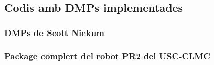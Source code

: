 \documentclass[12pt,a4paper,final,twoside]{article}
\begin{document}
\subsection{Codis amb DMPs implementades}
\subsubsection{DMPs de Scott Niekum}

\subsubsection{Package complert del robot PR2 del USC-CLMC}
\end{document}
